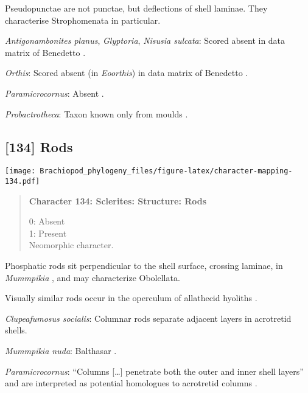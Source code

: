 \documentclass[openany]{book}
\theoremstyle{definition}
\theoremstyle{definition}
\theoremstyle{definition}
\theoremstyle{remark}
\begin{document}
Pseudopunctae are not punctae, but deflections of shell laminae. They
characterise Strophomenata in particular.

\hypertarget{Antigonambonites_planus-coding-133}{}
\emph{Antigonambonites planus}, \emph{Glyptoria}, \emph{Nisusia
sulcata}: Scored absent in data matrix of Benedetto
\citeyearpar{Benedetto2009iChaniella}.

\hypertarget{Orthis-coding-133}{}
\emph{Orthis}: Scored absent (in \emph{Eoorthis}) in data matrix of
Benedetto \citeyearpar{Benedetto2009iChaniella}.

\hypertarget{Paramicrocornus-coding-133}{}
\emph{Paramicrocornus}: Absent \citep{Zhang2018Ahyolithid}.

\hypertarget{Probactrotheca-coding-133}{}
\emph{Probactrotheca}: Taxon known only from moulds \citep{Valent2012}.

\subsection*{{[}134{]} Rods}\label{rods}

\texttt{[image: Brachiopod\_phylogeny\_files/figure-latex/character-mapping-134.pdf]}

\begin{quote}
\textbf{Character 134: Sclerites: Structure: Rods}

0: Absent\\
1: Present\\
Neomorphic character.
\end{quote}

Phosphatic rods sit perpendicular to the shell surface, crossing
laminae, in \emph{Mummpikia} \citep{Balthasar2008iMummpikia}, and may
characterize Obolellata.

Visually similar rods occur in the operculum of allathecid hyoliths
\citep[cf.][fig. 7J]{Kouchinsky2000Skeletalmicrostructures}.

\hypertarget{Clupeafumosus_socialis-coding-134}{}
\emph{Clupeafumosus socialis}: Columnar rods separate adjacent layers in
acrotretid shells.

\hypertarget{Mummpikia_nuda-coding-134}{}
\emph{Mummpikia nuda}: Balthasar \citeyearpar{Balthasar2008iMummpikia}.

\hypertarget{Paramicrocornus-coding-134}{}
\emph{Paramicrocornus}: ``Columns {[}\ldots{}{]} penetrate both the
outer and inner shell layers'' and are interpreted as potential
homologues to acrotretid columns \citep{Zhang2018Ahyolithid}.
\end{document}
